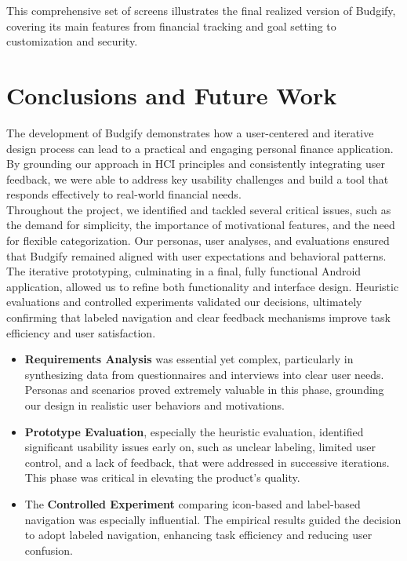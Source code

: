 \documentclass[a4paper,12pt]{article}
\begin{document}
\noindent This comprehensive set of screens illustrates the final realized version of Budgify, covering its main features from financial tracking and goal setting to customization and security.

\section{Conclusions and Future Work}
The development of Budgify demonstrates how a user-centered and iterative design process can lead to a practical and engaging personal finance application. By grounding our approach in HCI principles and consistently integrating user feedback, we were able to address key usability challenges and build a tool that responds effectively to real-world financial needs.
\vspace{0.5cm}\\
Throughout the project, we identified and tackled several critical issues, such as the demand for simplicity, the importance of motivational features, and the need for flexible categorization. Our personas, user analyses, and evaluations ensured that Budgify remained aligned with user expectations and behavioral patterns.
\vspace{0.5cm}\\
The iterative prototyping, culminating in a final, fully functional Android application, allowed us to refine both functionality and interface design. Heuristic evaluations and controlled experiments validated our decisions, ultimately confirming that labeled navigation and clear feedback mechanisms improve task efficiency and user satisfaction.
\begin{itemize}
    \item \textbf{Requirements Analysis} was essential yet complex, particularly in synthesizing data from questionnaires and interviews into clear user needs. Personas and scenarios proved extremely valuable in this phase, grounding our design in realistic user behaviors and motivations.
    \item \textbf{Prototype Evaluation}, especially the heuristic evaluation, identified significant usability issues early on, such as unclear labeling, limited user control, and a lack of feedback, that were addressed in successive iterations. This phase was critical in elevating the product’s quality.
    \item The \textbf{Controlled Experiment} comparing icon-based and label-based navigation was especially influential. The empirical results guided the decision to adopt labeled navigation, enhancing task efficiency and reducing user confusion.
\end{itemize}
\end{document}
